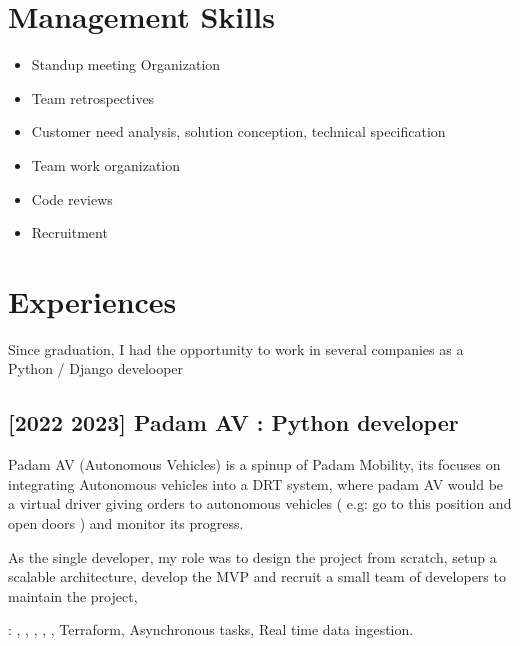 \documentclass[letterpaper,10pt,english]{sphinxmanual}
\begin{document}
\chapter{Management Skills}
\label{\detokenize{index:management-skills}}\begin{itemize}
\item {} 
\sphinxAtStartPar
Standup meeting Organization

\item {} 
\sphinxAtStartPar
Team retrospectives

\item {} 
\sphinxAtStartPar
Customer need analysis, solution conception, technical specification

\item {} 
\sphinxAtStartPar
Team work organization

\item {} 
\sphinxAtStartPar
Code reviews

\item {} 
\sphinxAtStartPar
Recruitment

\end{itemize}


\chapter{Experiences}
\label{\detokenize{index:experiences}}
\sphinxAtStartPar
Since graduation, I had the opportunity to work in several companies as a Python / Django develooper


\section{{[}2022 \sphinxhyphen{} 2023{]} Padam AV : Python developer}
\label{\detokenize{index:padam-av-python-developer}}
\sphinxAtStartPar
Padam AV (Autonomous Vehicles) is a spinup of Padam Mobility, its focuses on integrating Autonomous vehicles into a DRT
system, where padam AV would be a virtual driver giving orders to autonomous vehicles ( e.g: go to this position and open doors )
and monitor its progress.

\sphinxAtStartPar
As the single developer, my role was to design the project from scratch, setup a scalable architecture, develop the MVP
and recruit a small team of developers to maintain the project,

\sphinxAtStartPar
{} : , , , , , Terraform, Asynchronous tasks, Real time data ingestion.
\end{document}
